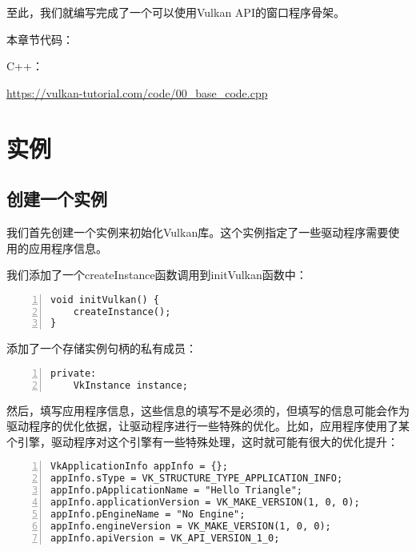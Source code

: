 \documentclass{ctexart}
\begin{document}
至此，我们就编写完成了一个可以使用Vulkan API的窗口程序骨架。

本章节代码：

C++：

\url{https://vulkan-tutorial.com/code/00_base_code.cpp}

\newpage
\section{实例}

\subsection{创建一个实例}

我们首先创建一个实例来初始化Vulkan库。这个实例指定了一些驱动程序需要使用的应用程序信息。

我们添加了一个createInstance函数调用到initVulkan函数中：

\begin{lstlisting}[language={[ANSI]C},keywordstyle=\color{blue!70},commentstyle=\color{red!50!green!50!blue!50},frame=shadowbox, rulesepcolor=\color{red!20!green!20!blue!20},basicstyle=\small,numbers=left, numberstyle=\tiny,breaklines=true]
void initVulkan() {
	createInstance();
}
\end{lstlisting}

添加了一个存储实例句柄的私有成员：

\begin{lstlisting}[language={[ANSI]C},keywordstyle=\color{blue!70},commentstyle=\color{red!50!green!50!blue!50},frame=shadowbox, rulesepcolor=\color{red!20!green!20!blue!20},basicstyle=\small,numbers=left, numberstyle=\tiny,breaklines=true]
private:
	VkInstance instance;
\end{lstlisting}

然后，填写应用程序信息，这些信息的填写不是必须的，但填写的信息可能会作为驱动程序的优化依据，让驱动程序进行一些特殊的优化。比如，应用程序使用了某个引擎，驱动程序对这个引擎有一些特殊处理，这时就可能有很大的优化提升：

\begin{lstlisting}[language={[ANSI]C},keywordstyle=\color{blue!70},commentstyle=\color{red!50!green!50!blue!50},frame=shadowbox, rulesepcolor=\color{red!20!green!20!blue!20},basicstyle=\small,numbers=left, numberstyle=\tiny,breaklines=true]
VkApplicationInfo appInfo = {};
appInfo.sType = VK_STRUCTURE_TYPE_APPLICATION_INFO;
appInfo.pApplicationName = "Hello Triangle";
appInfo.applicationVersion = VK_MAKE_VERSION(1, 0, 0);
appInfo.pEngineName = "No Engine";
appInfo.engineVersion = VK_MAKE_VERSION(1, 0, 0);
appInfo.apiVersion = VK_API_VERSION_1_0;
\end{lstlisting}
\end{document}
